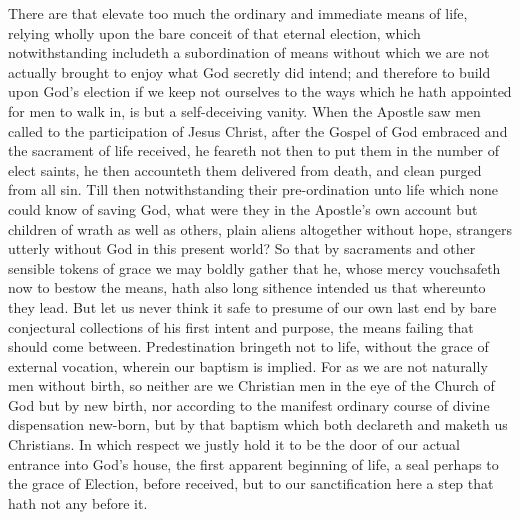There are that elevate too much the ordinary and immediate means of life, relying wholly upon the bare conceit of that eternal election, which notwithstanding includeth a subordination of means without which we are not actually brought to enjoy what God secretly did intend; and therefore to build upon God’s election if we keep not ourselves to the ways which he hath appointed for men to walk in, is but a self-deceiving vanity. When the Apostle saw men called to the participation of Jesus Christ, after the Gospel of God embraced and the sacrament of life received, he feareth not then to put them in the number of elect saints, he then accounteth them delivered from death, and clean purged from all sin. Till then notwithstanding their pre-ordination unto life which none could know of saving God, what were they in the Apostle’s own account but children of wrath as well as others, plain aliens altogether without hope, strangers utterly without God in this present world? So that by sacraments and other sensible tokens of grace we may boldly gather that he, whose mercy vouchsafeth now to bestow the means, hath also long sithence intended us that whereunto they lead. But let us never think it safe to presume of our own last end by bare conjectural collections of his first intent  and purpose, the means failing that should come between. Predestination bringeth not to life, without the grace of external vocation, wherein our baptism is implied. For as we are not naturally men without birth, so neither are we Christian men in the eye of the Church of God but by new birth, nor according to the manifest ordinary course of divine dispensation new-born, but by that baptism which both declareth and maketh us Christians. In which respect we justly hold it to be the door of our actual entrance into God’s house, the first apparent beginning of life, a seal perhaps to the grace of Election, before received, but to our sanctification here a step that hath not any before it.
